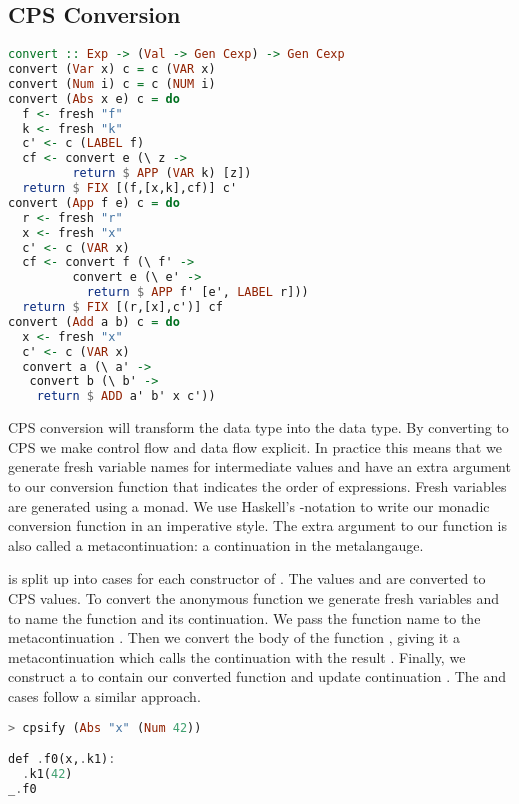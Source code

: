 \subsection{\label{subsection:cpsconvert}CPS Conversion}
\begin{lstlisting}[language=Haskell]
convert :: Exp -> (Val -> Gen Cexp) -> Gen Cexp
convert (Var x) c = c (VAR x)
convert (Num i) c = c (NUM i)
convert (Abs x e) c = do
  f <- fresh "f"
  k <- fresh "k"
  c' <- c (LABEL f)
  cf <- convert e (\ z ->
         return $ APP (VAR k) [z])
  return $ FIX [(f,[x,k],cf)] c'
convert (App f e) c = do
  r <- fresh "r"
  x <- fresh "x"
  c' <- c (VAR x)
  cf <- convert f (\ f' ->
         convert e (\ e' ->
           return $ APP f' [e', LABEL r]))
  return $ FIX [(r,[x],c')] cf
convert (Add a b) c = do
  x <- fresh "x"
  c' <- c (VAR x)
  convert a (\ a' ->
   convert b (\ b' ->
    return $ ADD a' b' x c'))
\end{lstlisting}

\ac{CPS} conversion will transform the  data type into the  data type. By converting to \ac{CPS} we make control flow and data flow explicit. In practice this means that we generate fresh variable names for intermediate values and have an extra argument to our conversion function that indicates the order of expressions. Fresh variables are generated using a monad. We use Haskell's -notation to write our monadic conversion function in an imperative style. The extra argument to our function is also called a metacontinuation: a continuation in the metalangauge.

 is split up into cases for each constructor of . The values  and  are converted to \ac{CPS} values. To convert the anonymous function  we generate fresh variables  and  to name the function and its continuation. We pass the function name to the metacontinuation . Then we convert the body of the function , giving it a metacontinuation which calls the continuation with the result . Finally, we construct a  to contain our converted function and update continuation . The  and  cases follow a similar approach.

\begin{lstlisting}[language=Haskell]
> cpsify (Abs "x" (Num 42))

def .f0(x,.k1):
  .k1(42)
_.f0
\end{lstlisting}

